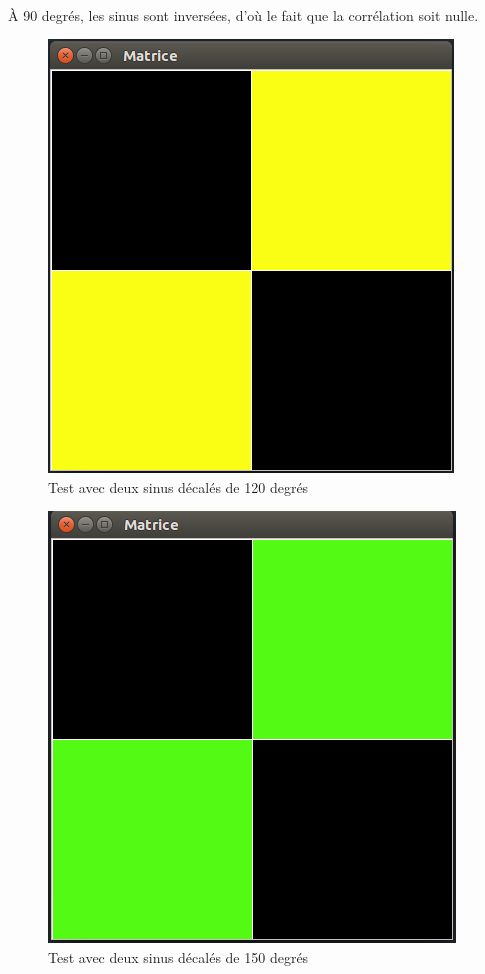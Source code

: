 \paragraph{}
À 90 degrés, les sinus sont inversées, d'où le fait que la corrélation soit nulle.
\begin{figure}[H]
    \centering
    \includegraphics[scale=0.3]{assets/Captures-sinus/PreprocDefaultnormal-120.png}
    \caption{Test avec deux sinus décalés de 120 degrés}
    \label{}
\end{figure}
\begin{figure}[H]
    \centering
    \includegraphics[scale=0.3]{assets/Captures-sinus/PreprocDefaultnormal-150.png}
    \caption{Test avec deux sinus décalés de 150 degrés}
    \label{}
\end{figure}
